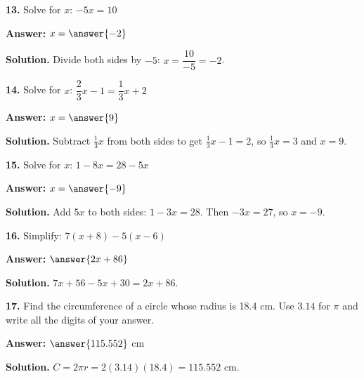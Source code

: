\documentclass{ximera}
\begin{document}
\begin{problem}

\textbf{13.} Solve for $x$: $-5x=10$

\textbf{Answer:} $x=\answer{-2}$

\begin{hint}
\textbf{Solution.} Divide both sides by $-5$: $x=\dfrac{10}{-5}=-2$.
\end{hint}
\end{problem}

\begin{problem}

\textbf{14.} Solve for $x$: $\dfrac{2}{3}x-1=\dfrac{1}{3}x+2$

\textbf{Answer:} $x=\answer{9}$

\begin{hint}
\textbf{Solution.} Subtract $\tfrac{1}{3}x$ from both sides to get $\tfrac{1}{3}x-1=2$, so
$\tfrac{1}{3}x=3$ and $x=9$.
\end{hint}
\end{problem}

\begin{problem}

\textbf{15.} Solve for $x$: $1-8x=28-5x$

\textbf{Answer:} $x=\answer{-9}$

\begin{hint}
\textbf{Solution.} Add $5x$ to both sides: $1-3x=28$. Then $-3x=27$, so $x=-9$.
\end{hint}
\end{problem}

\begin{problem}

\textbf{16.} Simplify: $7(x+8)-5(x-6)$

\textbf{Answer:} $\answer{2x+86}$

\begin{hint}
\textbf{Solution.} $7x+56-5x+30=2x+86$.
\end{hint}
\end{problem}

\begin{problem}

\textbf{17.} Find the circumference of a circle whose radius is 18.4 cm. Use $3.14$ for
$\pi$ and write all the digits of your answer.

\textbf{Answer:} $\answer{115.552}$ cm

\begin{hint}
\textbf{Solution.} $C=2\pi r=2(3.14)(18.4)=115.552$ cm.
\end{hint}
\end{problem}
\end{document}
